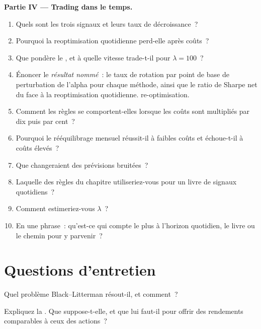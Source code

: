 \begin{problem}
\medskip\noindent\textbf{Partie IV --- Trading dans le temps.}
\begin{enumerate}[resume]
\item Quels sont les trois signaux et leurs taux de décroissance~?
\item Pourquoi la reoptimisation quotidienne perd-elle après coûts~?
\item Que pondère le , et à quelle vitesse trade-t-il pour $\lambda = 100$~?
\item Énoncer le \emph{résultat nommé}~: le taux de rotation par point de base de perturbation de l'alpha pour chaque méthode, ainsi que le ratio de Sharpe net du  face à la reoptimisation quotidienne.
re-optimisation.
\item Comment les règles se comportent-elles lorsque les coûts sont multipliés par dix puis par cent~?
\item Pourquoi le rééquilibrage mensuel réussit-il à faibles coûts et échoue-t-il à coûts élevés~?
\item Que changeraient des prévisions bruitées~?
\item Laquelle des règles du chapitre utiliseriez-vous pour un livre de signaux quotidiens~?
\item Comment estimeriez-vous $\lambda$~?
\item En une phrase~: qu'est-ce qui compte le plus à l'horizon quotidien, le livre ou le chemin pour y parvenir~?
\end{enumerate}
\end{problem}

\section{Questions d'entretien}

\begin{interviewq}\label{iq:rs:portfolio-construction-ii:1}
Quel problème Black--Litterman résout-il, et comment~?
\end{interviewq}

\begin{interviewq}\label{iq:rs:portfolio-construction-ii:2}
Expliquez la . Que suppose-t-elle, et que lui faut-il pour offrir des rendements comparables à ceux des actions~?
\end{interviewq}

